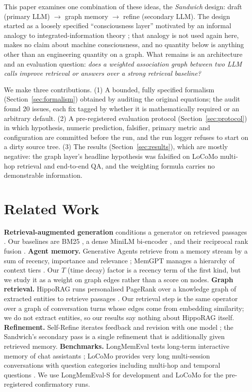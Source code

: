 \documentclass[10pt]{article}
\begin{document}
This paper examines one combination of these ideas, the \emph{Sandwich} design: draft (primary LLM) $\rightarrow$ graph memory $\rightarrow$ refine (secondary LLM). The design started as a loosely specified ``consciousness layer'' motivated by an informal analogy to integrated-information theory \cite{tononi2008iit}; that analogy is not used again here, makes no claim about machine consciousness, and no quantity below is anything other than an engineering quantity on a graph. What remains is an architecture and an evaluation question: \emph{does a weighted association graph between two LLM calls improve retrieval or answers over a strong retrieval baseline?}

We make three contributions. (1) A bounded, fully specified formalism (Section~\ref{sec:formalism}) obtained by auditing the original equations; the audit found 20 issues, each fix tagged by whether it is mathematically required or an arbitrary default. (2) A pre-registered evaluation protocol (Section~\ref{sec:protocol}) in which hypothesis, numeric prediction, falsifier, primary metric and configuration are committed before the run, and the run logger refuses to start on a dirty source tree. (3) The results (Section~\ref{sec:results}), which are mostly negative: the graph layer's headline hypothesis was falsified on LoCoMo multi-hop retrieval and end-to-end QA, and the weighting formula carries no demonstrable information.

\section{Related Work}
\textbf{Retrieval-augmented generation} conditions a generator on retrieved passages \cite{lewis2020rag}. Our baselines are BM25 \cite{robertson2009bm25}, a dense MiniLM bi-encoder \cite{wang2020minilm,reimers2019sbert}, and their reciprocal rank fusion \cite{cormack2009rrf}. \textbf{Agent memory.} Generative Agents retrieve from a memory stream by a sum of recency, importance and relevance \cite{park2023generative}; MemGPT manages a hierarchy of context tiers \cite{packer2023memgpt}. Our $T$ (time decay) factor is a recency term of the first kind, but we study it as a weight on graph edges rather than a score on nodes. \textbf{Graph retrieval.} HippoRAG runs personalised PageRank \cite{page1999pagerank} over a knowledge graph of extracted entities to retrieve passages \cite{gutierrez2024hipporag}. Our retrieval step is the same operator over a graph of conversation turns whose edges come from embedding similarity; we do not extract entities, so our results say nothing about HippoRAG itself. \textbf{Refinement.} Self-Refine iterates feedback and revision with one model \cite{madaan2023selfrefine}; the Sandwich's secondary pass is a single refinement that is additionally given retrieved memory. \textbf{Benchmarks.} LongMemEval tests long-term interactive memory of chat assistants \cite{wu2025longmemeval}; LoCoMo provides very long multi-session conversations with question categories including multi-hop and temporal questions \cite{maharana2024locomo}. We use LongMemEval-S for development and LoCoMo for the pre-registered confirmatory runs.
\end{document}

